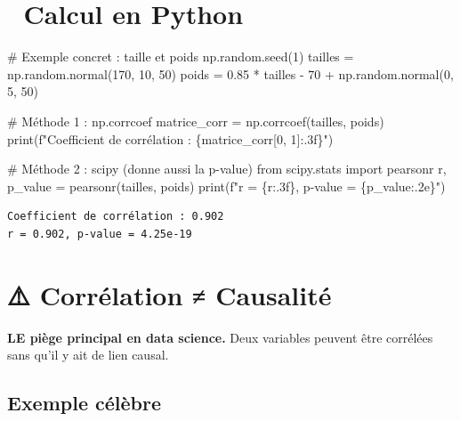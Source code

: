 \documentclass[
  french,
  11pt,
  a4paper,
]{scrbook}
\newenvironment{Shaded}{}{}
\newcommand{\BuiltInTok}[1]{\textcolor[rgb]{0.84,0.23,0.29}{#1}}
\newcommand{\CommentTok}[1]{\textcolor[rgb]{0.42,0.45,0.49}{#1}}
\newcommand{\DecValTok}[1]{\textcolor[rgb]{0.00,0.36,0.77}{#1}}
\newcommand{\FloatTok}[1]{\textcolor[rgb]{0.00,0.36,0.77}{#1}}
\newcommand{\ImportTok}[1]{\textcolor[rgb]{0.01,0.18,0.38}{#1}}
\newcommand{\NormalTok}[1]{\textcolor[rgb]{0.14,0.16,0.18}{#1}}
\newcommand{\OperatorTok}[1]{\textcolor[rgb]{0.14,0.16,0.18}{#1}}
\newcommand{\SpecialCharTok}[1]{\textcolor[rgb]{0.00,0.36,0.77}{#1}}
\newcommand{\SpecialStringTok}[1]{\textcolor[rgb]{0.01,0.18,0.38}{#1}}
\begin{document}
\section{🧮 Calcul en Python}\label{calcul-en-python}

\begin{Shaded}
\begin{Highlighting}[]
\CommentTok{\# Exemple concret : taille et poids}
\NormalTok{np.random.seed(}\DecValTok{1}\NormalTok{)}
\NormalTok{tailles }\OperatorTok{=}\NormalTok{ np.random.normal(}\DecValTok{170}\NormalTok{, }\DecValTok{10}\NormalTok{, }\DecValTok{50}\NormalTok{)}
\NormalTok{poids }\OperatorTok{=} \FloatTok{0.85} \OperatorTok{*}\NormalTok{ tailles }\OperatorTok{{-}} \DecValTok{70} \OperatorTok{+}\NormalTok{ np.random.normal(}\DecValTok{0}\NormalTok{, }\DecValTok{5}\NormalTok{, }\DecValTok{50}\NormalTok{)}

\CommentTok{\# Méthode 1 : np.corrcoef}
\NormalTok{matrice\_corr }\OperatorTok{=}\NormalTok{ np.corrcoef(tailles, poids)}
\BuiltInTok{print}\NormalTok{(}\SpecialStringTok{f"Coefficient de corrélation : }\SpecialCharTok{\{}\NormalTok{matrice\_corr[}\DecValTok{0}\NormalTok{, }\DecValTok{1}\NormalTok{]}\SpecialCharTok{:.3f\}}\SpecialStringTok{"}\NormalTok{)}

\CommentTok{\# Méthode 2 : scipy (donne aussi la p{-}value)}
\ImportTok{from}\NormalTok{ scipy.stats }\ImportTok{import}\NormalTok{ pearsonr}
\NormalTok{r, p\_value }\OperatorTok{=}\NormalTok{ pearsonr(tailles, poids)}
\BuiltInTok{print}\NormalTok{(}\SpecialStringTok{f"r = }\SpecialCharTok{\{}\NormalTok{r}\SpecialCharTok{:.3f\}}\SpecialStringTok{, p{-}value = }\SpecialCharTok{\{}\NormalTok{p\_value}\SpecialCharTok{:.2e\}}\SpecialStringTok{"}\NormalTok{)}
\end{Highlighting}
\end{Shaded}

\begin{verbatim}
Coefficient de corrélation : 0.902
r = 0.902, p-value = 4.25e-19
\end{verbatim}

\section{⚠️ Corrélation ≠ Causalité}\label{corruxe9lation-causalituxe9}

\textbf{LE piège principal en data science.} Deux variables peuvent être
corrélées sans qu'il y ait de lien causal.

\subsection{Exemple célèbre}\label{exemple-cuxe9luxe8bre}
\end{document}
